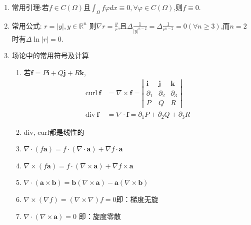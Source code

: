 \documentclass[12pt, a4paper]{ctexart}
\begin{document}
\begin{itemize}
\begin{enumerate}
            \item 常用引理:若$f \in C(\Omega)$且$\int_{\Omega} f \varphi dx \equiv 0, \forall \varphi \in C(\Omega)$,则$f\equiv0$.
            
            \item 常用公式: $ r = |y|, y \in \mathbb{R}^n $ 则$ \nabla r = \frac{y}{r}$,且$\Delta \frac1{|y|^{n-2}} = \Delta \frac1{r^{n-2}} = 0 (\forall n \geq 3)$,而$n=2$时有$\Delta \ln |r| = 0$.
            
            \item 场论中的常用符号及计算
            \begin{enumerate}
                \item 若$\bm f = P \bm i + Q \bm j + R \bm k $, 
                \begin{align*}
                \text{curl}\ \bm f &= \nabla \times \bm f = \left|
                \begin{array}{ccc}
                \bm i & \bm j & \bm k \\
                \partial_1 & \partial_2 & \partial_3 \\
                P & Q & R
                \end{array} \right| \\ 
                \text{div}\ \bm f &= \nabla \cdot \bm f = \partial_1  P + \partial_2  Q + \partial_3  R 
                \end{align*}
                \item div, curl都是线性的
                \item $ \nabla \cdot (f\bm a) = f \cdot (\nabla \cdot \bm a) + \nabla f \cdot \bm a$
                \item $ \nabla \times (f\bm a) = f \cdot(\nabla\times\bm a) + \nabla f \times \bm a$
                \item $ \nabla \cdot (\bm a \times \bm b) = \bm b (\nabla\times\bm a) - \bm a (\nabla\times\bm b)$
                \item $\nabla\times(\nabla f) = (\nabla \times \nabla) f = 0$\qquad 即：梯度无旋
                \item $\nabla \cdot (\nabla \times\bm a) = 0$ \qquad 即：旋度零散
                

\end{enumerate}
\end{enumerate}
\end{itemize}
\end{document}
